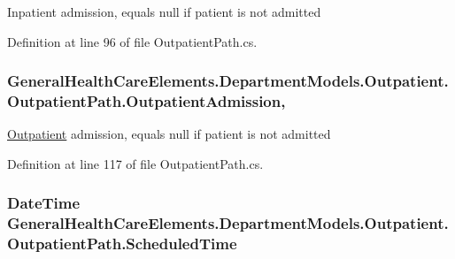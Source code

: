 Inpatient admission, equals null if patient is not admitted 



Definition at line 96 of file Outpatient\+Path.\+cs.

\subsubsection[{\texorpdfstring{Outpatient\+Admission}{OutpatientAdmission}}]{ General\+Health\+Care\+Elements.\+Department\+Models.\+Outpatient.\+Outpatient\+Path.\+Outpatient\+Admission\hspace{0.3cm}{\ttfamily [get]}, {\ttfamily [set]}}\hypertarget{class_general_health_care_elements_1_1_department_models_1_1_outpatient_1_1_outpatient_path_a88fafde1a32497d6a6b3dba85777e3fc}{}\label{class_general_health_care_elements_1_1_department_models_1_1_outpatient_1_1_outpatient_path_a88fafde1a32497d6a6b3dba85777e3fc}


\hyperlink{namespace_general_health_care_elements_1_1_department_models_1_1_outpatient}{Outpatient} admission, equals null if patient is not admitted 



Definition at line 117 of file Outpatient\+Path.\+cs.

\subsubsection[{\texorpdfstring{Scheduled\+Time}{ScheduledTime}}]{\setlength{\rightskip}{0pt plus 5cm}Date\+Time General\+Health\+Care\+Elements.\+Department\+Models.\+Outpatient.\+Outpatient\+Path.\+Scheduled\+Time\hspace{0.3cm}{\ttfamily [get]}}\hypertarget{class_general_health_care_elements_1_1_department_models_1_1_outpatient_1_1_outpatient_path_af80acd93c354794b7b64fc5668e2a1d6}{}\label{class_general_health_care_elements_1_1_department_models_1_1_outpatient_1_1_outpatient_path_af80acd93c354794b7b64fc5668e2a1d6}


